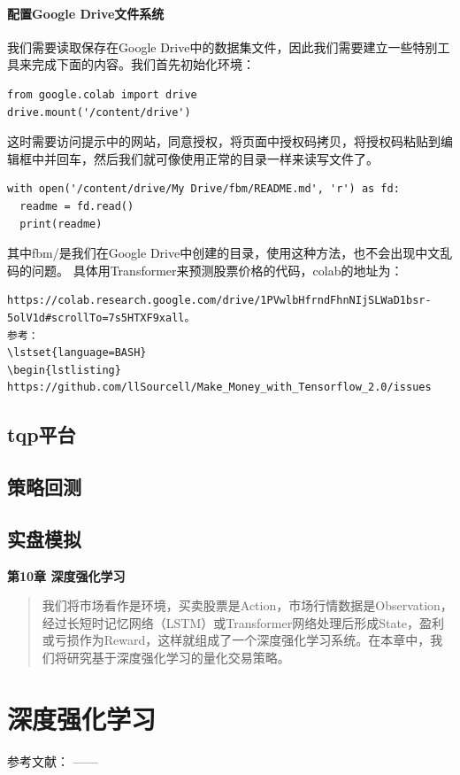 \documentclass{article}
\begin{document}
\paragraph{配置Google Drive文件系统}
我们需要读取保存在Google Drive中的数据集文件，因此我们需要建立一些特别工具来完成下面的内容。我们首先初始化环境：
\begin{lstlisting}
from google.colab import drive
drive.mount('/content/drive')
\end{lstlisting}
这时需要访问提示中的网站，同意授权，将页面中授权码拷贝，将授权码粘贴到编辑框中并回车，然后我们就可像使用正常的目录一样来读写文件了。
\begin{lstlisting}
with open('/content/drive/My Drive/fbm/README.md', 'r') as fd:
  readme = fd.read()
  print(readme)
\end{lstlisting}
其中fbm/是我们在Google Drive中创建的目录，使用这种方法，也不会出现中文乱码的问题。
具体用Transformer来预测股票价格的代码，colab的地址为：
\lstset{language=BASH}
\begin{lstlisting}
https://colab.research.google.com/drive/1PVwlbHfrndFhnNIjSLWaD1bsr-5olV1d#scrollTo=7s5HTXF9xall。
参考：
\lstset{language=BASH}
\begin{lstlisting}
https://github.com/llSourcell/Make_Money_with_Tensorflow_2.0/issues
\end{lstlisting}
\subsection{tqp平台}
\subsection{策略回测}
\subsection{实盘模拟}

\maketitle\begin{center}
\Large \textbf{第10章 深度强化学习}
\end{center}
\begin{abstract}
我们将市场看作是环境，买卖股票是Action，市场行情数据是Observation，经过长短时记忆网络（LSTM）或Transformer网络处理后形成State，盈利或亏损作为Reward，这样就组成了一个深度强化学习系统。在本章中，我们将研究基于深度强化学习的量化交易策略。
\end{abstract}
\section{深度强化学习}



参考文献：
\cite{ex1}---\cite{ex2}---\cite{refa001}

\newpage




\appendix
\end{document}
